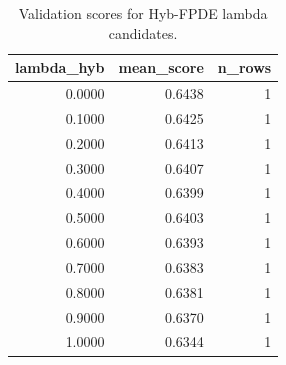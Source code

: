 \begin{table}[t]
\caption{Validation scores for Hyb-FPDE lambda candidates.}
\label{tab:lambda_distribution_computed}
\centering
\begin{tabular}{rrr}
\toprule
lambda\_hyb & mean\_score & n\_rows \\
\midrule
0.0000 & 0.6438 & 1 \\
0.1000 & 0.6425 & 1 \\
0.2000 & 0.6413 & 1 \\
0.3000 & 0.6407 & 1 \\
0.4000 & 0.6399 & 1 \\
0.5000 & 0.6403 & 1 \\
0.6000 & 0.6393 & 1 \\
0.7000 & 0.6383 & 1 \\
0.8000 & 0.6381 & 1 \\
0.9000 & 0.6370 & 1 \\
1.0000 & 0.6344 & 1 \\
\bottomrule
\end{tabular}

\end{table}
